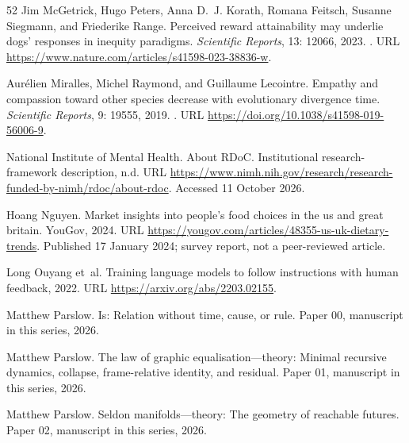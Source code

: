 \documentclass[11pt,a4paper]{article}
\theoremstyle{remark}
\begin{document}
\begin{thebibliography}{52}
Jim McGetrick, Hugo Peters, Anna D.~J. Korath, Romana Feitsch, Susanne
  Siegmann, and Friederike Range.
\newblock Perceived reward attainability may underlie dogs' responses in
  inequity paradigms.
\newblock \emph{Scientific Reports}, 13: 12066, 2023.
\newblock {}.
\newblock URL \url{https://www.nature.com/articles/s41598-023-38836-w}.

Aur{\'e}lien Miralles, Michel Raymond, and Guillaume Lecointre.
\newblock Empathy and compassion toward other species decrease with
  evolutionary divergence time.
\newblock \emph{Scientific Reports}, 9: 19555, 2019.
\newblock {}.
\newblock URL \url{https://doi.org/10.1038/s41598-019-56006-9}.

{National Institute of Mental Health}.
\newblock About RDoC.
\newblock Institutional research-framework description, n.d.
\newblock URL \url{https://www.nimh.nih.gov/research/research-funded-by-nimh/rdoc/about-rdoc}.
\newblock Accessed 11 October 2026.

Hoang Nguyen.
\newblock Market insights into people's food choices in the us and great
  britain.
\newblock YouGov, 2024.
\newblock URL \url{https://yougov.com/articles/48355-us-uk-dietary-trends}.
\newblock Published 17 January 2024; survey report, not a peer-reviewed
  article.

Long Ouyang et~al.
\newblock Training language models to follow instructions with human feedback,
  2022.
\newblock URL \url{https://arxiv.org/abs/2203.02155}.

Matthew Parslow.
\newblock Is: Relation without time, cause, or rule.
\newblock Paper 00, manuscript in this series, 2026{}.

Matthew Parslow.
\newblock The law of graphic equalisation---theory: Minimal recursive dynamics,
  collapse, frame-relative identity, and residual.
\newblock Paper 01, manuscript in this series, 2026{}.

Matthew Parslow.
\newblock Seldon manifolds---theory: The geometry of reachable futures.
\newblock Paper 02, manuscript in this series, 2026{}.


\end{thebibliography}
\end{document}
